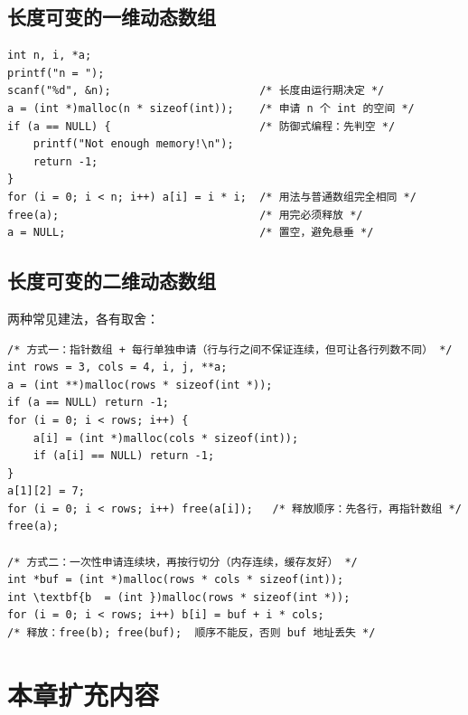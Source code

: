 \subsection{长度可变的一维动态数组}
\begin{lstlisting}
int n, i, *a;
printf("n = ");
scanf("%d", &n);                       /* 长度由运行期决定 */
a = (int *)malloc(n * sizeof(int));    /* 申请 n 个 int 的空间 */
if (a == NULL) {                       /* 防御式编程：先判空 */
    printf("Not enough memory!\n");
    return -1;
}
for (i = 0; i < n; i++) a[i] = i * i;  /* 用法与普通数组完全相同 */
free(a);                               /* 用完必须释放 */
a = NULL;                              /* 置空，避免悬垂 */
\end{lstlisting}

\subsection{长度可变的二维动态数组}
两种常见建法，各有取舍：
\begin{lstlisting}
/* 方式一：指针数组 + 每行单独申请（行与行之间不保证连续，但可让各行列数不同） */
int rows = 3, cols = 4, i, j, **a;
a = (int **)malloc(rows * sizeof(int *));
if (a == NULL) return -1;
for (i = 0; i < rows; i++) {
    a[i] = (int *)malloc(cols * sizeof(int));
    if (a[i] == NULL) return -1;
}
a[1][2] = 7;
for (i = 0; i < rows; i++) free(a[i]);   /* 释放顺序：先各行，再指针数组 */
free(a);

/* 方式二：一次性申请连续块，再按行切分（内存连续，缓存友好） */
int *buf = (int *)malloc(rows * cols * sizeof(int));
int \textbf{b  = (int })malloc(rows * sizeof(int *));
for (i = 0; i < rows; i++) b[i] = buf + i * cols;
/* 释放：free(b); free(buf);  顺序不能反，否则 buf 地址丢失 */
\end{lstlisting}


\section{本章扩充内容}

